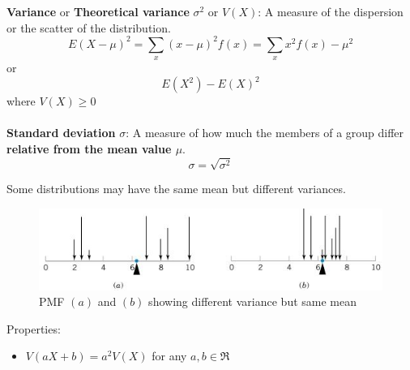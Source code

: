 \documentclass[10pt,a4paper]{article}
\begin{document}
\pagebreak

\begin{tcolorbox}[breakable,colback=white]
    \textbf{Variance} or \textbf{Theoretical variance} $\sigma^2$ or $V(X)$: A measure of the dispersion
    or the scatter of the distribution.
    $$
        E(X-\mu)^2 = \sum_x(x-\mu)^2f(x) = \sum_xx^2f(x)-\mu^2
    $$
    or
    $$
       E(X^2) - E(X)^2
    $$
    where $V(X) \geq 0$
    \\
    \\
    \textbf{Standard deviation} $\sigma$: A measure of how much the members of a group
    differ \textbf{relative from the mean value $\mu$}.
    $$
        \sigma = \sqrt{\sigma^2}
    $$
\end{tcolorbox}

Some distributions may have the same mean but different variances. 

\begin{figure} [h!]
    \centering
    \includegraphics[]{Mean.JPG}
    \caption{PMF $(a)$ and $(b)$ showing different variance but same mean}
\end{figure}

Properties:
\begin{itemize}
    \item $V(aX+b)=a^2V(X)$ for any $a,b \in \Re$
\end{itemize}
\end{document}
